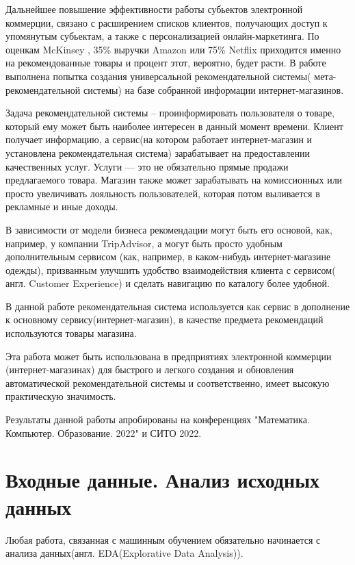 \documentclass[14pt]{mmcs_article}
\begin{document}
Дальнейшее повышение эффективности работы субьектов электронной коммерции, связано с расширением списков клиентов, получающих доступ к упомянутым субьектам, а также с персонализацией онлайн-маркетинга. По оценкам McKinsey \cite{INTRO:a1}, 35\% выручки Amazon или 75\% Netflix приходится именно на рекомендованные товары и процент этот, вероятно, будет расти. В работе выполнена попытка создания универсальной рекомендательной системы( мета-рекомендательной системы) на базе собранной информации интернет-магазинов. 

Задача рекомендательной системы – проинформировать пользователя о товаре, который ему может быть наиболее интересен в данный момент времени. Клиент получает информацию, а сервис(на котором работает интернет-магазин и установлена рекомендательная система) зарабатывает на предоставлении качественных услуг. Услуги — это не обязательно прямые продажи предлагаемого товара. Магазин также может зарабатывать на комиссионных или просто увеличивать лояльность пользователей, которая потом выливается в рекламные и иные доходы.

В зависимости от модели бизнеса рекомендации могут быть его основой, как, например, у компании TripAdvisor, а могут быть просто удобным дополнительным сервисом (как, например, в каком-нибудь интернет-магазине одежды), призванным улучшить удобство взаимодействия клиента с сервисом( англ. Customer Experience) и сделать навигацию по каталогу более удобной. 

В данной работе рекомендательная система используется как сервис в дополнение к основному сервису(интернет-магазин), в качестве предмета рекомендаций используются товары магазина. 

Эта работа может быть использована в предприятиях электронной коммерции (интернет-магазинах) для быстрого и легкого создания и обновления автоматической рекомендательной системы и соответственно, имеет высокую практическую значимость.

Результаты данной работы апробированы на конференциях "Математика. Компьютер. Образование. 2022" и СИТО 2022.

\newpage


\section{Входные данные. Анализ исходных данных}\label{dsfs}
Любая работа, связанная с машинным обучением обязательно начинается с анализа данных(англ. EDA(Explorative Data Analysis)).
\end{document}
